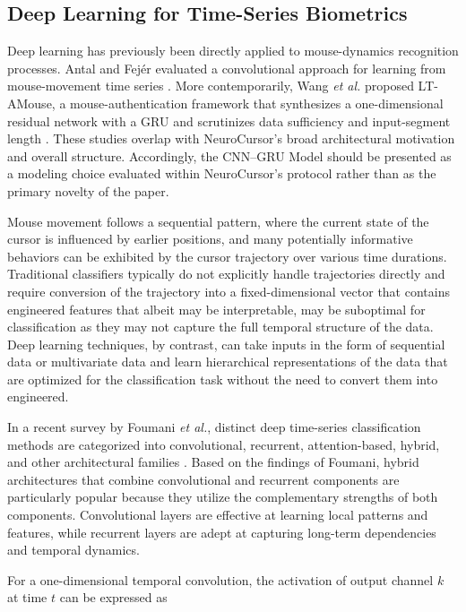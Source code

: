 \documentclass[conference]{IEEEtran}
\begin{document}
\subsection{Deep Learning for Time-Series Biometrics}

Deep learning has previously been directly applied to mouse-dynamics recognition processes. Antal and Fej\'er evaluated a convolutional approach for learning from mouse-movement time series \cite{antalFejer2020}. More contemporarily, Wang \textit{et al.} proposed LT-AMouse, a mouse-authentication framework that synthesizes a one-dimensional residual network with a GRU and scrutinizes data sufficiency and input-segment length \cite{wang2025Mouse}. These studies overlap with NeuroCursor's broad architectural motivation and overall structure. Accordingly, the CNN--GRU Model should be presented as a modeling choice evaluated within NeuroCursor's protocol rather than as the primary novelty of the paper. 

Mouse movement follows a sequential pattern, where the current state of the cursor is influenced by earlier positions, and many potentially informative behaviors can be exhibited by the cursor trajectory over various time durations. Traditional classifiers typically do not explicitly handle trajectories directly and require conversion of the trajectory into a fixed-dimensional vector that contains engineered features that albeit may be interpretable, may be suboptimal for classification as they may not capture the full temporal structure of the data. Deep learning techniques, by contrast, can take inputs in the form of sequential data or multivariate data and learn hierarchical representations of the data that are optimized for the classification task without the need to convert them into engineered. 

In a recent survey by Foumani \textit{et al.}, distinct deep time-series classification methods are categorized into convolutional, recurrent, attention-based, hybrid, and other architectural families \cite{foumaniTimeSeriesSurvey}. Based on the findings of Foumani, hybrid architectures that combine convolutional and recurrent components are particularly popular because they utilize the complementary strengths of both components. Convolutional layers are effective at learning local patterns and features, while recurrent layers are adept at capturing long-term dependencies and temporal dynamics.

For a one-dimensional temporal convolution, the activation of output channel $k$ at time $t$ can be expressed as
\end{document}
